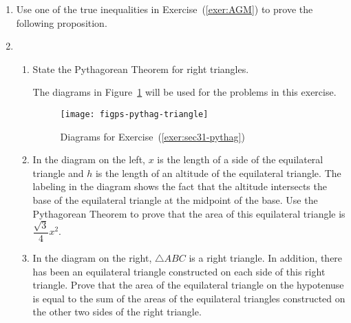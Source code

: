 \begin{enumerate}
\item Use one of the true inequalities in Exercise~(\ref{exer:AGM}) to prove the following proposition.



\item \begin{enumerate}\label{exer:sec31-pythag}
\item State the Pythagorean Theorem for right triangles.

The diagrams in Figure~\ref{fig:for-exer-pythag} will be used for the problems in this exercise.
\begin{figure}[h]
\begin{center}
\texttt{[image: figps-pythag-triangle]}
\end{center}
\caption{Diagrams for Exercise~(\ref{exer:sec31-pythag})}
\label{fig:for-exer-pythag}
\end{figure} 

\item In the diagram on the left,  $x$  is the length of a side of the equilateral triangle and  
$h$  is the length of an altitude of the equilateral triangle.  The labeling in the diagram shows the fact that the altitude intersects the base of the equilateral triangle at the midpoint of the base.
Use the Pythagorean Theorem to prove that the area of this equilateral triangle is 
$\dfrac{\sqrt{3}}{4}x^2$.
\item In the diagram on the right, $\triangle ABC$ is a right triangle.  In addition, there has been an equilateral triangle constructed on each side of this right triangle.  Prove that the area of the equilateral triangle on the hypotenuse is equal to the sum of the areas of the equilateral triangles constructed on the other two sides of the right triangle.
\end{enumerate}





\end{enumerate}

